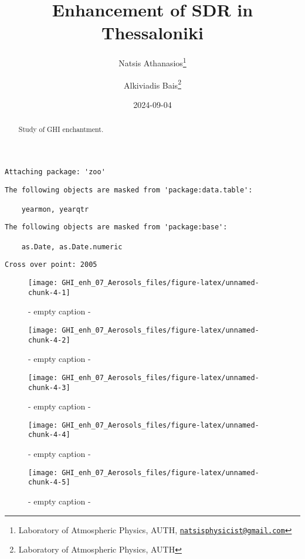 \documentclass[
  10pt,
  a4paper,oneside]{article}
\title{Enhancement of SDR in Thessaloniki}
\author{Natsis Athanasios\footnote{Laboratory of Atmospheric Physics, AUTH, \href{mailto:natsisphysicist@gmail.com}{\nolinkurl{natsisphysicist@gmail.com}}} \and Alkiviadis Bais\footnote{Laboratory of Atmospheric Physics, AUTH}}
\date{2024-09-04}
\begin{document}
\maketitle
\begin{abstract}
Study of GHI enchantment.
\end{abstract}

{
\hypersetup{linkcolor=}
\setcounter{tocdepth}{4}
\tableofcontents
}
\begin{verbatim}
Attaching package: 'zoo'
\end{verbatim}

\begin{verbatim}
The following objects are masked from 'package:data.table':

    yearmon, yearqtr
\end{verbatim}

\begin{verbatim}
The following objects are masked from 'package:base':

    as.Date, as.Date.numeric
\end{verbatim}

\begin{verbatim}
Cross over point: 2005 
\end{verbatim}

\begin{figure}[H]

{\centering \texttt{[image: GHI\_enh\_07\_Aerosols\_files/figure-latex/unnamed-chunk-4-1]} 

}

\caption{ - empty caption - }\label{fig:unnamed-chunk-4-1}
\end{figure}
\begin{figure}[H]

{\centering \texttt{[image: GHI\_enh\_07\_Aerosols\_files/figure-latex/unnamed-chunk-4-2]} 

}

\caption{ - empty caption - }\label{fig:unnamed-chunk-4-2}
\end{figure}
\begin{figure}[H]

{\centering \texttt{[image: GHI\_enh\_07\_Aerosols\_files/figure-latex/unnamed-chunk-4-3]} 

}

\caption{ - empty caption - }\label{fig:unnamed-chunk-4-3}
\end{figure}
\begin{figure}[H]

{\centering \texttt{[image: GHI\_enh\_07\_Aerosols\_files/figure-latex/unnamed-chunk-4-4]} 

}

\caption{ - empty caption - }\label{fig:unnamed-chunk-4-4}
\end{figure}
\begin{figure}[H]

{\centering \texttt{[image: GHI\_enh\_07\_Aerosols\_files/figure-latex/unnamed-chunk-4-5]} 

}

\caption{ - empty caption - }\label{fig:unnamed-chunk-4-5}
\end{figure}
\end{document}
